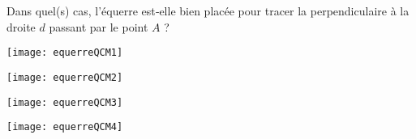 \begin{QCM}
\begin{GroupeQCM}
    \begin{exercice}
     Dans quel(s) cas, l'équerre est‑elle bien placée pour tracer la perpendiculaire à la droite $d$ passant par le point $A$ ?
      \begin{ChoixQCM}{4}
      \item \texttt{[image: equerreQCM1]}
      \item \texttt{[image: equerreQCM2]}
      \item \texttt{[image: equerreQCM3]}
      \item \texttt{[image: equerreQCM4]}
      \end{ChoixQCM}
\begin{corrige}
   \end{corrige}
    \end{exercice}

   \end{GroupeQCM}  
 \end{QCM}  
 
